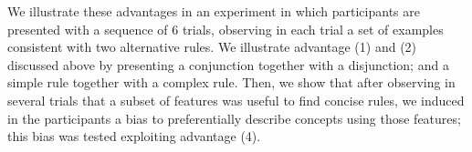 
We illustrate these advantages in an experiment in which participants are presented with a sequence of 6 trials, observing in each trial a set of examples consistent with two alternative rules. We illustrate advantage (1) and (2) discussed above by presenting a conjunction together with a disjunction; and a simple rule together with a complex rule. Then, we show that after observing in several trials that a subset of features was useful to find concise rules, we induced in the participants a bias to preferentially describe concepts using those features; this bias was tested exploiting advantage (4).

\color{black}



